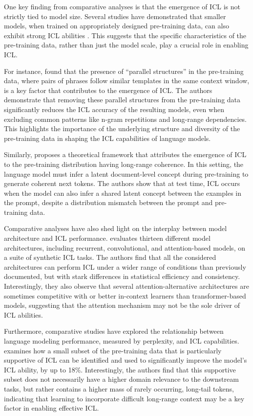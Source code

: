 \documentclass[11pt]{article}
\begin{document}
One key finding from comparative analyses is that the emergence of ICL is not strictly tied to model size. Several studies have demonstrated that smaller models, when trained on appropriately designed pre-training data, can also exhibit strong ICL abilities \cite{ref296}. This suggests that the specific characteristics of the pre-training data, rather than just the model scale, play a crucial role in enabling ICL.

For instance, \cite{ref297} found that the presence of ``parallel structures'' in the pre-training data, where pairs of phrases follow similar templates in the same context window, is a key factor that contributes to the emergence of ICL. The authors demonstrate that removing these parallel structures from the pre-training data significantly reduces the ICL accuracy of the resulting models, even when excluding common patterns like n-gram repetitions and long-range dependencies. This highlights the importance of the underlying structure and diversity of the pre-training data in shaping the ICL capabilities of language models.

Similarly, \cite{ref3} proposes a theoretical framework that attributes the emergence of ICL to the pre-training distribution having long-range coherence. In this setting, the language model must infer a latent document-level concept during pre-training to generate coherent next tokens. The authors show that at test time, ICL occurs when the model can also infer a shared latent concept between the examples in the prompt, despite a distribution mismatch between the prompt and pre-training data.

Comparative analyses have also shed light on the interplay between model architecture and ICL performance. \cite{ref298} evaluates thirteen different model architectures, including recurrent, convolutional, and attention-based models, on a suite of synthetic ICL tasks. The authors find that all the considered architectures can perform ICL under a wider range of conditions than previously documented, but with stark differences in statistical efficiency and consistency. Interestingly, they also observe that several attention-alternative architectures are sometimes competitive with or better in-context learners than transformer-based models, suggesting that the attention mechanism may not be the sole driver of ICL abilities.

Furthermore, comparative studies have explored the relationship between language modeling performance, measured by perplexity, and ICL capabilities. \cite{ref299} examines how a small subset of the pre-training data that is particularly supportive of ICL can be identified and used to significantly improve the model's ICL ability, by up to 18\%. Interestingly, the authors find that this supportive subset does not necessarily have a higher domain relevance to the downstream tasks, but rather contains a higher mass of rarely occurring, long-tail tokens, indicating that learning to incorporate difficult long-range context may be a key factor in enabling effective ICL.
\end{document}
